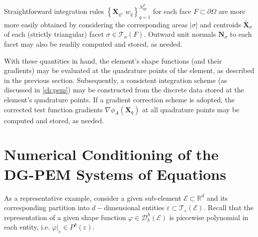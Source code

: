 	Straightforward integration rules $\left\{ \mathbf{X}_q, \, w_q \right\}_{q=1}^{N^F_{qp}}$ for each face $F \subset \partial \Omega$ are more more easily obtained by considering the corresponding areas $|\sigma|$ and centroids $\bar{\mathbf{X}}_\sigma$ of each (strictly triangular) facet $\sigma \in \mathcal{T}_{\sigma} (F)$. Outward unit normals $\mathbf{N}_\sigma$ to each facet may also be readily computed and stored, as needed.

	With these quantities in hand, the element's shape functions (and their gradients) may be evaluated at the quadrature points of the element, as described in the previous section. Subsequently, a consistent integration scheme (as discussed in \ref{ch:pem}) may be constructed from the discrete data stored at the element's quadrature points. If a gradient correction scheme is adopted, the corrected test function gradients $\nabla \phi_A (\mathbf{X}_q)$ at all quadrature points may be computed and stored, as needed.

\section{Numerical Conditioning of the \\ DG-PEM Systems of Equations}

As a representative example, consider a given sub-element $\mathcal{E} \subset \mathbb{R}^d$ and its corresponding partition into $d-$dimensional entities $\varepsilon \subset \mathcal{T}_\varepsilon (\mathcal{E})$. Recall that the representation of a given shape function $\varphi \in \mathcal{D}^h_k (\mathcal{E})$ is piecewise polynomial in each entity, i.e. $\varphi|_{\varepsilon} \in P^k (\varepsilon)$.

